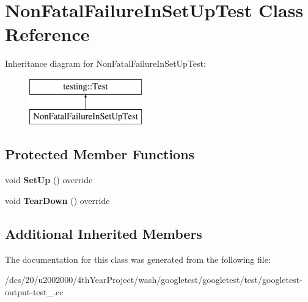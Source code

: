 \hypertarget{classNonFatalFailureInSetUpTest}{}\section{Non\+Fatal\+Failure\+In\+Set\+Up\+Test Class Reference}
\label{classNonFatalFailureInSetUpTest}
Inheritance diagram for Non\+Fatal\+Failure\+In\+Set\+Up\+Test\+:\begin{figure}[H]
\begin{center}
\leavevmode
\includegraphics[height=2.000000cm]{classNonFatalFailureInSetUpTest}
\end{center}
\end{figure}
\subsection*{Protected Member Functions}
\begin{DoxyCompactItemize}
\item 
\mbox{\label{classNonFatalFailureInSetUpTest_ae8a49eec423dff7ef00e4d27cd9e39fa}} 
void {\bfseries Set\+Up} () override
\item 
\mbox{\label{classNonFatalFailureInSetUpTest_a564b41b4e07d4e9c6921d1f2e1be9352}} 
void {\bfseries Tear\+Down} () override
\end{DoxyCompactItemize}
\subsection*{Additional Inherited Members}


The documentation for this class was generated from the following file\+:\begin{DoxyCompactItemize}
\item 
/dcs/20/u2002000/4th\+Year\+Project/wash/googletest/googletest/test/googletest-\/output-\/test\+\_\+.\+cc\end{DoxyCompactItemize}

